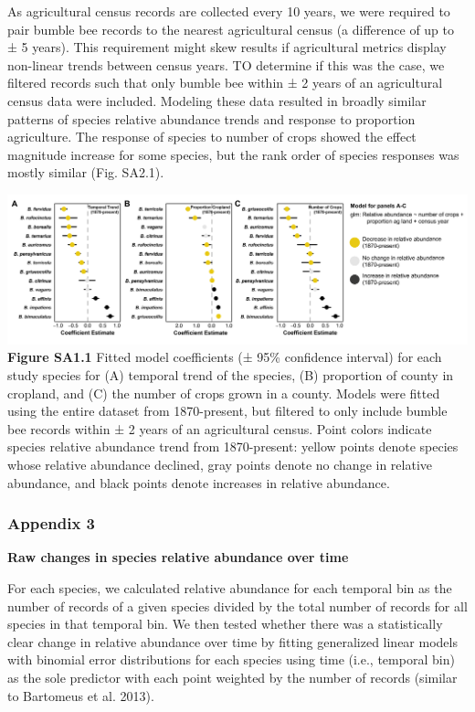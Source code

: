 \documentclass[11pt,]{article}
\begin{document}
As agricultural census records are collected every 10 years, we were
required to pair bumble bee records to the nearest agricultural census
(a difference of up to ± 5 years). This requirement might skew results
if agricultural metrics display non-linear trends between census years.
TO determine if this was the case, we filtered records such that only
bumble bee within ± 2 years of an agricultural census data were
included. Modeling these data resulted in broadly similar patterns of
species relative abundance trends and response to proportion
agriculture. The response of species to number of crops showed the
effect magnitude increase for some species, but the rank order of
species responses was mostly similar (Fig. SA2.1).

\includegraphics[width=1\textwidth,height=\textheight]{../ms_figs/appendix2.png}
\textbf{Figure SA1.1} Fitted model coefficients (± 95\% confidence
interval) for each study species for (A) temporal trend of the species,
(B) proportion of county in cropland, and (C) the number of crops grown
in a county. Models were fitted using the entire dataset from
1870-present, but filtered to only include bumble bee records within ± 2
years of an agricultural census. Point colors indicate species relative
abundance trend from 1870-present: yellow points denote species whose
relative abundance declined, gray points denote no change in relative
abundance, and black points denote increases in relative abundance.

\newpage

\hypertarget{appendix-3}{%
\subsubsection{Appendix 3}\label{appendix-3}}

\textbf{Raw changes in species relative abundance over time}

For each species, we calculated relative abundance for each temporal bin
as the number of records of a given species divided by the total number
of records for all species in that temporal bin. We then tested whether
there was a statistically clear change in relative abundance over time
by fitting generalized linear models with binomial error distributions
for each species using time (i.e., temporal bin) as the sole predictor
with each point weighted by the number of records (similar to Bartomeus
et al. 2013).
\end{document}
